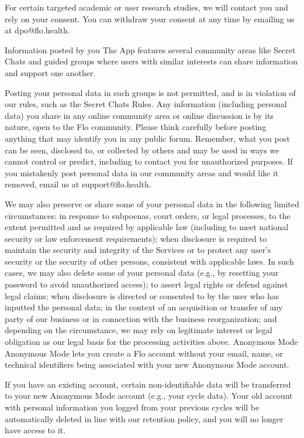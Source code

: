 For certain targeted academic or user research studies, we will contact you and rely on your consent. You can withdraw your consent at any time by emailing us at dpo@flo.health.

Information posted by you
The App features several community areas like Secret Chats and guided groups where users with similar interests can share information and support one another. 

Posting your personal data in such groups is not permitted, and is in violation of our rules, such as the Secret Chats Rules. Any information (including personal data) you share in any online community area or online discussion is by its nature, open to the Flo community. Please think carefully before posting anything that may identify you in any public forum. Remember, what you post can be seen, disclosed to, or collected by others and may be used in ways we cannot control or predict, including to contact you for unauthorized purposes. If you mistakenly post personal data in our community areas and would like it removed, email us at support@flo.health. 

We may also preserve or share some of your personal data in the following limited circumstances: 
in response to subpoenas, court orders, or legal processes, to the extent permitted and as required by applicable law (including to meet national security or law enforcement requirements); 
when disclosure is required to maintain the security and integrity of the Services or to protect any user’s security or the security of other persons, consistent with applicable laws. In such cases, we may also delete some of your personal data (e.g., by resetting your password to avoid unauthorized access);
to assert legal rights or defend against legal claims; 
when disclosure is directed or consented to by the user who has inputted the personal data; 
in the context of an acquisition or transfer of any party of our business or in connection with the business reorganization; and
depending on the circumstance, we may rely on legitimate interest or legal obligation as our legal basis for the processing activities above.
Anonymous Mode
Anonymous Mode lets you create a Flo account without your email, name, or technical identifiers being associated with your new Anonymous Mode account. 

If you have an existing account, certain non-identifiable data will be transferred to your new Anonymous Mode account (e.g., your cycle data). Your old account with personal information you logged from your previous cycles will be automatically deleted in line with our retention policy, and you will no longer have access to it.

